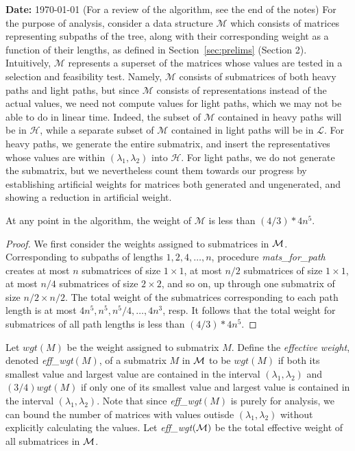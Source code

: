 \documentclass[12pt]{article}
\begin{document}

\begin{spacing}{1.5}
\noindent\textbf{Date:} \today
\vskip 0.2in\noindent
(For a review of the algorithm, see the end of the notes)
\vskip 0.2in\noindent
For the purpose of analysis, consider a data structure $\mathcal{M}$ which consists of matrices representing subpaths of the tree, along with their corresponding weight as a function of their lengths, as defined in Section~\ref{sec:prelims} (Section 2). 
Intuitively, $\mathcal{M}$ represents a superset of the matrices whose values are tested in a selection and feasibility test. 
Namely, $\mathcal{M}$ consists of submatrices of both heavy paths and light paths, but since $\mathcal{M}$ consists of representations instead of the actual values, we need not compute values for light paths, which we may not be able to do in linear time. 
Indeed, the subset of $\mathcal{M}$ contained in heavy paths will be in $\mathcal{H}$, while a separate subset of $\mathcal{M}$ contained in light paths will be in $\mathcal{L}$.
For heavy paths, we generate the entire submatrix, and insert the representatives whose values are within $(\lambda_1,\lambda_2)$ into $\mathcal{H}$. 
For light paths, we do not generate the submatrix, but we nevertheless count them towards our progress by establishing artificial weights for matrices both generated and ungenerated, and showing a reduction in artificial weight.


\begin{lemma}
At any point in the algorithm, the weight of $\mathcal{M}$ is less than $(4/3)*4n^5$.
\end{lemma}
\begin{proof}
We first consider the weights assigned to submatrices in $\cal M$.
Corresponding to subpaths of lengths $1, 2, 4, \ldots , n$,
procedure {\it mats\_for\_path} creates
at most $n$ submatrices of size $1 \times 1$,
at most $n/2$ submatrices of size $1 \times 1$,
at most $n/4$ submatrices of size $2 \times 2$, and so on,
up through one submatrix of size $n/2 \times n/2$.
The total weight of the submatrices corresponding to each path length is at most
$4n^5, n^5, n^5/4, \ldots , 4n^3$, resp.
It follows that the total weight for submatrices of all path lengths is
less than $(4/3)*4n^5$.
\end{proof}

Let $wgt(M)$ be the weight assigned to submatrix $M$.
Define the {\it effective weight},
denoted {\it eff\_wgt}$(M)$, of a submatrix $M$ in $\cal M$
to be $wgt(M)$ if both its smallest value and largest value
are contained in the interval $(\lambda_1, \lambda_2)$
and $(3/4)wgt(M)$ if only one of its smallest value and largest value
is contained in the interval $(\lambda_1, \lambda_2)$. 
Note that since {\it eff\_wgt}$(M)$ is purely for analysis, we can bound the 
number of matrices with values outisde $(\lambda_1, \lambda_2)$ without explicitly calculating the values. 
Let {\it eff\_wgt}$(\cal M )$ be the total effective weight of all submatrices in $\cal M$.


\end{spacing}
\end{document}
